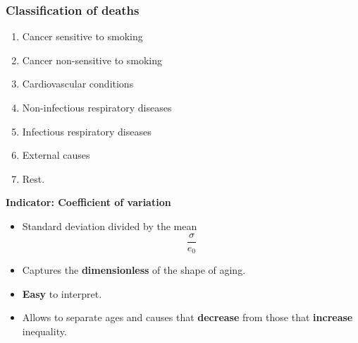 \documentclass[xcolor={dvipsnames}]{beamer}
\begin{document}
\begin{frame}\frametitle{Classification of deaths}
\Large{

		\begin{enumerate}
		
		
\color{blue} 		\item Cancer sensitive to smoking

\color{green}		\item Cancer non-sensitive to smoking
		
\color{ForestGreen}	\item Cardiovascular conditions
		
\color{orange}		\item Non-infectious respiratory diseases
		
\color{Orange}	    \item Infectious respiratory diseases

\color{Red}	       \item External causes
		
\color{gray}       \item Rest.

		
		\end{enumerate}			

}
\end{frame}




%



\begin{frame}
\Large{
\textbf{Indicator: Coefficient of variation}
\pause
\begin{itemize}
\item Standard deviation divided by the mean
\begin{equation*}
\frac{\sigma}{e_0}
\end{equation*}
\item Captures the \textbf{dimensionless} of the shape of aging.
\pause
\item \textbf{Easy} to interpret.
\pause
\item Allows to separate ages and causes that \textbf{decrease} from those that \textbf{increase} inequality.
\end{itemize}

}
\end{frame}
\end{document}
